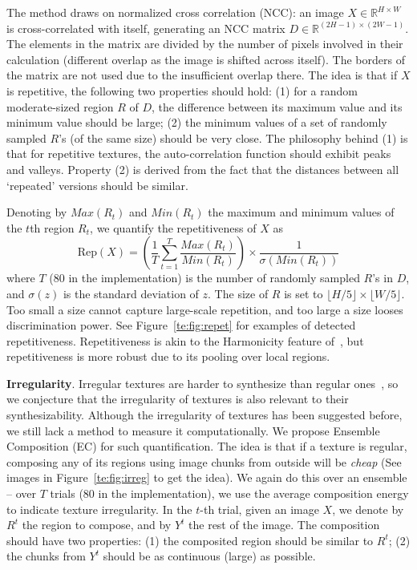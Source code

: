 The method draws on normalized cross correlation (NCC): an image $X
\in \mathbb{R}^{H\times W}$ is cross-correlated with itself,
generating an NCC matrix $D\in \mathbb{R}^{(2H-1)\times (2W-1)}$. The
elements in the matrix are divided by the number of pixels involved in
their calculation (different overlap as the image is shifted across
itself). The borders of the matrix are not used due to the insufficient
overlap there. The idea is that  if $X$ is repetitive, the following two
properties should hold: (1) for a random moderate-sized region $R$ of
$D$, the difference between its maximum value and its minimum value
should be large; (2) the minimum values of a set of randomly sampled
$R$'s (of the same size) should be very close.  The philosophy behind
(1) is that for repetitive textures, the auto-correlation function
should exhibit peaks and valleys. Property (2) is derived from the fact
that the distances between all `repeated' versions should be
similar.

Denoting by $Max(R_t)$ and $Min(R_t)$ the maximum and minimum values
of the $t$th region $R_t$, we quantify the repetitiveness of $X$ as
\begin{equation} 
\text{Rep}(X) = \left( \frac{1}{T} \sum_{t=1}^T \frac{Max(R_t)}{Min(R_t)} \right)
                \times \frac{1}{\sigma(Min(R_t))}
\end{equation}
where $T$ ($80$ in the implementation) is the number of randomly
sampled $R$'s in $D$, and $\sigma(z)$ is the standard deviation of
$z$. The size of $R$ is set to $\lfloor H/5 \rfloor \times \lfloor W/5
\rfloor$. Too small a size cannot capture large-scale repetition, and
too large a size looses discrimination power.  See
Figure~\ref{te:fig:repet} for examples of detected
repetitiveness. Repetitiveness is akin to the Harmonicity feature
of~\citep{liu:texture:96}, but repetitiveness is more robust due to its
pooling over local regions.

\textbf{Irregularity}. Irregular textures are harder to synthesize
than regular ones~\citep{Liu:2004:NTA}, so we conjecture that the
irregularity of textures is also relevant to their
synthesizability. Although the irregularity of textures has been
suggested before, we still lack a method to measure it
computationally. We propose Ensemble Composition (EC) for such
quantification. The idea is that if a texture is regular, composing
any of its regions using image chunks from outside will be
\emph{cheap} (See images in Figure~\ref{te:fig:irreg} to get the idea).  We
again do this over an ensemble -- over $T$ trials ($80$ in the
implementation), we use the average composition energy to indicate
texture irregularity. In the $t$-th trial, given an image $X$, we
denote by $R^t$ the region to compose, and by $Y^t$ the rest of the
image. The composition should have two properties: (1) the composited
region should be similar to $R^t$; (2) the chunks from $Y^t$ should be
as continuous (large) as possible.

